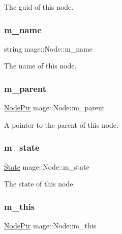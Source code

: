 The guid of this node. \hypertarget{classmage_1_1_node_a476cc21fa65cdf9bde0f11fe08b5a707}{}\label{classmage_1_1_node_a476cc21fa65cdf9bde0f11fe08b5a707} 
\subsubsection{\texorpdfstring{m\+\_\+name}{m\_name}}
{\footnotesize\ttfamily string mage\+::\+Node\+::m\+\_\+name\hspace{0.3cm}{\ttfamily [private]}}

The name of this node. \hypertarget{classmage_1_1_node_aa04f166b52fca444c8756c0864a16cde}{}\label{classmage_1_1_node_aa04f166b52fca444c8756c0864a16cde} 
\subsubsection{\texorpdfstring{m\+\_\+parent}{m\_parent}}
{\footnotesize\ttfamily \hyperlink{classmage_1_1_node_ac575dc006e0ae1134277ade977dc06b6}{Node\+Ptr} mage\+::\+Node\+::m\+\_\+parent\hspace{0.3cm}{\ttfamily [private]}}

A pointer to the parent of this node. \hypertarget{classmage_1_1_node_a76b775e32bb001c54a9927461eaf7926}{}\label{classmage_1_1_node_a76b775e32bb001c54a9927461eaf7926} 
\subsubsection{\texorpdfstring{m\+\_\+state}{m\_state}}
{\footnotesize\ttfamily \hyperlink{namespacemage_ae47d13d8477ee94893b9a3947d28eebc}{State} mage\+::\+Node\+::m\+\_\+state\hspace{0.3cm}{\ttfamily [private]}}

The state of this node. \hypertarget{classmage_1_1_node_ab056e1563dca22433efa152f4b6da46f}{}\label{classmage_1_1_node_ab056e1563dca22433efa152f4b6da46f} 
\subsubsection{\texorpdfstring{m\+\_\+this}{m\_this}}
{\footnotesize\ttfamily \hyperlink{classmage_1_1_node_ac575dc006e0ae1134277ade977dc06b6}{Node\+Ptr} mage\+::\+Node\+::m\+\_\+this\hspace{0.3cm}{\ttfamily [private]}}

